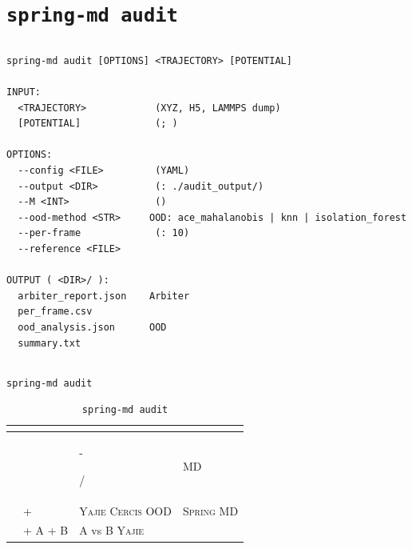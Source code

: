 \documentclass[12pt,a4paper]{article}
\theoremstyle{remark}
\newcommand{\Yajie}{\textsc{Yajie}}
\newcommand{\Cercis}{\textsc{Cercis}}
\newcommand{\SpringMD}{\textsc{Spring MD}}
\begin{document}
\newpage

\section{\texttt{spring-md audit}}

\subsection{}

\begin{lstlisting}[caption={\texttt{spring-md audit} },label=lst:audit]
spring-md audit [OPTIONS] <TRAJECTORY> [POTENTIAL]

INPUT:
  <TRAJECTORY>            (XYZ, H5, LAMMPS dump)
  [POTENTIAL]             (; )

OPTIONS:
  --config <FILE>         (YAML)
  --output <DIR>          (: ./audit_output/)
  --M <INT>               ()
  --ood-method <STR>     OOD: ace_mahalanobis | knn | isolation_forest
  --per-frame             (: 10)
  --reference <FILE>     

OUTPUT ( <DIR>/ ):
  arbiter_report.json    Arbiter
  per_frame.csv          
  ood_analysis.json      OOD
  summary.txt            
\end{lstlisting}

\subsection{}

\texttt{spring-md audit}

\begin{table}[H]
\centering
\caption{\texttt{spring-md audit}}
\label{tab:audit_modes}
\renewcommand{\arraystretch}{1.5}
\small
\begin{tabular}{@{}p{2.2cm} p{3.0cm} p{3.0cm} p{5.0cm}@{}}
\toprule
\textbf{} & \textbf{} & \textbf{} & \textbf{} \\
\midrule
\textbf{} &
 &

-

/ &
MD \\
\midrule
\textbf{} &
 +  &
\Yajie{}
\Cercis{}
OOD &
\SpringMD{} \\
\midrule
\textbf{} &
 + A +
B &
A vs B
\Yajie{}
 &
 \\
\bottomrule
\end{tabular}
\end{table}
\end{document}
